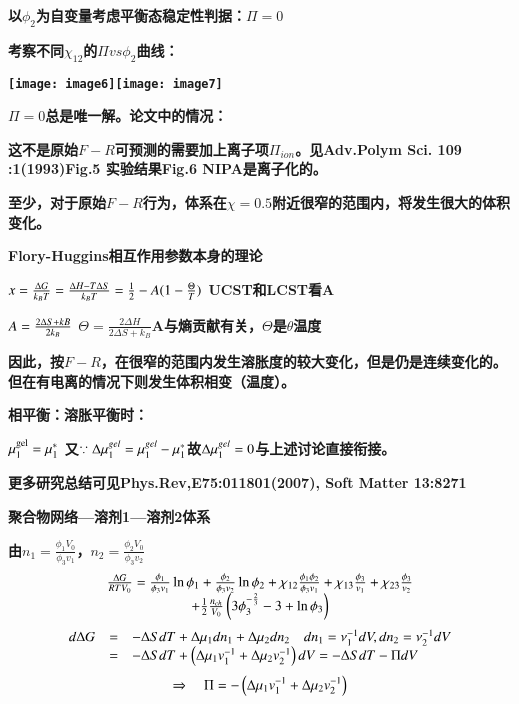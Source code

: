 \documentclass{article} %
\begin{document}
{\bf  以$\phi _{2} $为自变量考虑平衡态稳定性判据：$\Pi =0$}

\noindent 
{\bf 考察不同$\chi _{12} $的$\Pi vs\phi _{2} $曲线：}

\noindent 
{\bf \texttt{[image: image6]}\texttt{[image: image7]}}

\noindent 
{\bf $\Pi =0$总是唯一解。论文中的情况：}

\noindent 
{\bf 这不是原始$F-R$可预测的需要加上离子项$\Pi _{ion} $。见Adv.Polym Sci. 109 :1(1993)Fig.5 实验结果Fig.6 NIPA是离子化的。}

\noindent 
{\bf 至少，对于原始$F-R$行为，体系在$\chi =0.5$附近很窄的范围内，将发生很大的体积变化。}


{\bf  Flory-Huggins相互作用参数本身的理论}

\noindent 
{\bf $x=\frac{{\rm \Delta }G}{k_{B} T} =\frac{{\rm \Delta }H-T{\rm \Delta }S}{k_{B} T} =\frac{1}{2} -A(1-\frac{\Theta }{T} )$ UCST和LCST看A}

\noindent 
{\bf $A=\frac{2{\rm \Delta }S+kB}{2k_{B} } $ $\Theta =\frac{2\Delta H}{2\Delta S+k_{B} } $A与熵贡献有关，$\Theta $是$\theta $温度}

\noindent 
{\bf 因此，按$F-R$，在很窄的范围内发生溶胀度的较大变化，但是仍是连续变化的。但在有电离的情况下则发生体积相变（温度）。}


{\bf  相平衡：溶胀平衡时：}

\noindent 
{\bf $\mu _{1}^{{\rm gel}} =\mu _{1}^{*} $ 又$\because {\rm \Delta }\mu _{1}^{gel} =\mu _{1}^{gel} -\mu _{1}^{*} $故${\rm \Delta }\mu _{1}^{gel} =0$与上述讨论直接衔接。}

\noindent 
{\bf 更多研究总结可见Phys.Rev,E75:011801(2007), Soft Matter 13:8271}


{\bf  聚合物网络---溶剂1---溶剂2体系}

\noindent 
{\bf 由$n_{1} =\frac{\phi _{1} V_{0} }{\phi _{3} v_{1} } $，$n_{2} =\frac{\phi _{2} V_{0} }{\phi _{3} v_{2} } $
\[\begin{array}{c} {\frac{{\rm \Delta }G}{RTV_{0} } =\frac{\phi _{1} }{\phi _{3} v_{1} } \ln \phi _{1} +\frac{\phi _{2} }{\phi _{3} v_{2} } \ln \phi _{2} +\chi _{12} \frac{\phi _{1} \phi _{2} }{\phi _{3} v_{1} } +\chi _{13} \frac{\phi _{3} }{v_{1} } +\chi _{23} \frac{\phi _{3} }{v_{2} } } \\ {+\frac{1}{2} \frac{n_{ch} }{V_{0} } \left(3\phi _{3}^{-\frac{2}{3} } -3+\ln \phi _{3} \right)} \end{array}\] 
\[\begin{array}{rcl} {d{\rm \Delta }G} & {=} & {-{\rm \Delta }SdT+{\rm \Delta }\mu _{1} dn_{1} +{\rm \Delta }\mu _{2} dn_{2} \quad dn_{1} =\nu _{1}^{-1} dV,dn_{2} =\nu _{2}^{-1} dV} \\ {} & {=} & {-{\rm \Delta }SdT+\left({\rm \Delta }\mu _{1} v_{1}^{-1} +\Delta \mu _{2} v_{2}^{-1} \right)dV=-{\rm \Delta }SdT-\Pi dV} \end{array}\] 
\[\Rightarrow \quad \Pi =-\left({\rm \Delta }\mu _{1} v_{1}^{-1} +{\rm \Delta }\mu _{2} v_{2}^{-1} \right)\] }
\end{document}
